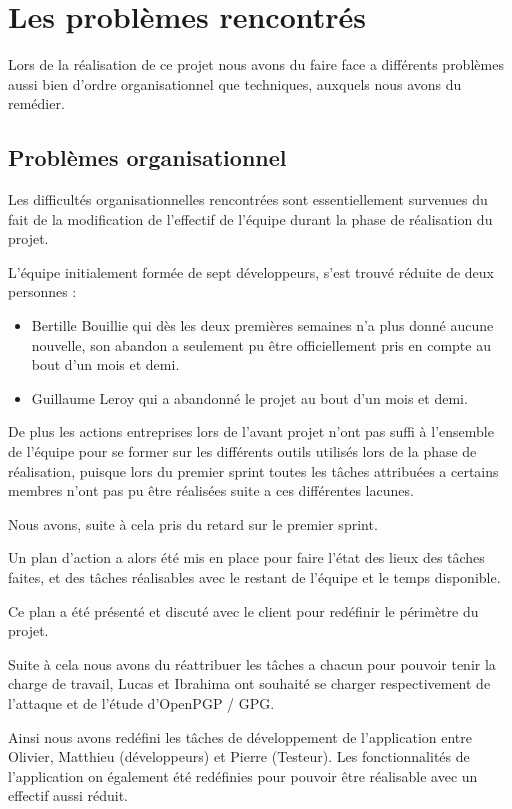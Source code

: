 \documentclass{../res/univ-projet}
\begin{document}
\section{Les problèmes rencontrés}

  Lors de la réalisation de ce projet nous avons du faire face a
  différents problèmes aussi bien d'ordre organisationnel que techniques,
  auxquels nous avons du remédier.

  \subsection{Problèmes organisationnel}

    Les difficultés organisationnelles rencontrées sont essentiellement
    survenues du fait de la modification de l'effectif de l'équipe durant la
    phase de réalisation du projet. 

    L'équipe initialement formée de sept développeurs,
    s'est trouvé réduite de deux personnes :
    \begin{itemize}
      \item Bertille Bouillie qui dès les deux premières semaines n'a plus donné
      aucune nouvelle, son abandon a seulement pu être officiellement pris en compte au bout d'un mois et demi.
      \item Guillaume Leroy qui a abandonné le projet au bout d'un mois et demi.
    \end{itemize}
    De plus les actions entreprises lors de l'avant projet n'ont pas suffi à l'ensemble de l'équipe 
    pour se former sur les différents outils utilisés lors de la phase de réalisation,
    puisque lors du premier sprint toutes les tâches attribuées a certains membres n'ont pas pu être
    réalisées suite a ces différentes lacunes.

    Nous avons, suite à cela pris du retard sur le premier sprint.

    Un plan d'action a alors été mis en place pour faire l'état des lieux des tâches
    faites, et des tâches réalisables avec le restant de l'équipe et le temps disponible.

    Ce plan a été présenté et discuté avec le client pour redéfinir le périmètre du projet.

    Suite à cela nous avons du réattribuer les tâches a chacun pour pouvoir tenir la charge de travail,
    Lucas et Ibrahima ont souhaité se charger respectivement de l'attaque et de l'étude d'OpenPGP / GPG.

    Ainsi nous avons redéfini les tâches de développement de l'application
    entre Olivier, Matthieu (développeurs) et Pierre (Testeur).
    Les fonctionnalités de l'application on également été redéfinies pour pouvoir être réalisable avec un effectif
    aussi réduit.
\end{document}
